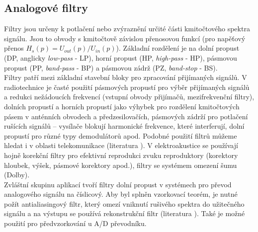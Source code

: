 \subsection{Analogové filtry}
Filtry jsou určeny k potlačení nebo zvýraznění určité části kmitočtového spektra signálu. Jsou to obvody s kmitočtově závislou přenosovou funkcí (pro napěťový přenos $H_s(p) = U_{out}(p)/U_{in}(p)$). Základní rozdělení je na dolní propust (DP, anglicky \textit{low-pass} - LP), horní propust (HP, \textit{high-pass} - HP), pásmovou propust (PP, \textit{band-pass} - BP) a pásmovou zádrž (PZ, \textit{band-stop} - BS). \\
Filtry patří mezi základní stavební bloky pro zpracování přijímaných signálů. V radiotechnice je časté použití pásmových propustí pro výběr přijímaných signálů  a redukci nežádoucích frekvencí (vstupní obvody přijímačů, mezifrekvenční filtry), dolních propustí a horních propustí jako výhybek pro rozdělení kmitočtových pásem v anténních obvodech a předzesilovačích, pásmových zádrží pro potlačení rušících signálů -- vysílače blokují harmonické frekvence, které interferují, dolní propustí pro různé typy demodulátorů apod. Podobné použití filtrů můžeme hledat i v oblasti telekomunikace (literatura \cite{5}). V elektroakustice se používají hojně korekční filtry pro efektivní reprodukci zvuku reproduktory (korektory hloubek, výšek, pásmové korektory apod.), filtry se systémem omezení šumu (Dolby).\\
Zvláštní skupinu aplikací tvoří filtry dolní propust v systémech pro převod analogového signálu na číslicový. Aby byl splněn vzorkovací teorém, je nutné požít antialiasingový filtr, který omezí vniknutí rušivého spektra do užitečného signálu a na výstupu se používá rekonstrukční filtr (literatura \cite{6}). Také je možné použití pro předvzorkování u A/D převodníku.\\

